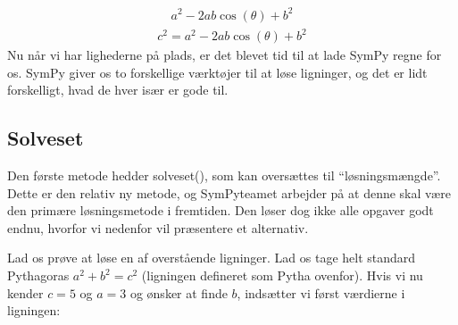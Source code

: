 \documentclass[letterpaper,10pt,english]{jupyterBook}
\begin{document}
\begin{sphinxVerbatim}[commandchars=\\\{\}]
   

       

            
\end{sphinxVerbatim}
\begin{equation*}
\begin{split}\displaystyle a^{2} - 2 a b \cos{\left(\theta \right)} + b^{2}\end{split}
\end{equation*}\begin{equation*}
\begin{split}\displaystyle c^{2} = a^{2} - 2 a b \cos{\left(\theta \right)} + b^{2}\end{split}
\end{equation*}
Nu når vi har lighederne på plads, er det blevet tid til at lade SymPy regne for os. SymPy giver os to forskellige værktøjer til at løse ligninger, og det er lidt forskelligt, hvad de hver især er gode til.


\subsection{Solveset}
\label{\detokenize{notebooks/sympy/Notebook3_ligninger:solveset}}
Den første metode hedder solveset(), som kan oversættes til “løsningsmængde”. Dette er den relativ ny metode, og SymPy\sphinxhyphen{}teamet arbejder på at denne skal være den primære løsningsmetode i fremtiden. Den løser dog ikke alle opgaver godt endnu, hvorfor vi nedenfor vil præsentere et alternativ.

Lad os prøve at løse en af overstående ligninger. Lad os tage helt standard Pythagoras \(a^2 + b^2 = c^2\) (ligningen defineret som Pytha ovenfor). Hvis vi nu  kender \(c=5\) og \(a=3\) og ønsker at finde \(b\), indsætter vi først værdierne i ligningen:
\end{document}
